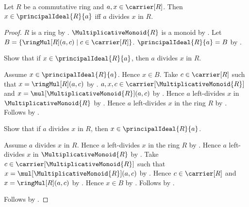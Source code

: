 \begin{theorem}\label{principal_ideal_membership_iff_divisibility}
    Let $R$ be a commutative ring and $a,x\in\carrier[R]$.
    Then $x\in\principalIdeal{R}{a}$ iff $a$ divides $x$ in $R$.
\end{theorem}
\begin{proof}
    $R$ is a ring by .
    $\MultiplicativeMonoid{R}$ is a monoid by
        .
    Let $B=\{\ringMul[R](a,c)\mid c\in\carrier[R]\}$.
    $\principalIdeal{R}{a}=B$ by
        .

    Show that if $x\in\principalIdeal{R}{a}$, then
        $a$ divides $x$ in $R$.
    \begin{subproof}
        Assume $x\in\principalIdeal{R}{a}$.
        Hence $x\in B$.
        Take $c\in\carrier[R]$ such that
            $x=\ringMul[R](a,c)$ by \auto.
        $a,x,c\in\carrier[\MultiplicativeMonoid{R}]$ and
            $x=\mul[\MultiplicativeMonoid{R}](a,c)$ by
            .
        Hence $a$ left-divides $x$ in $\MultiplicativeMonoid{R}$ by
            .
        Hence $a$ left-divides $x$ in the ring $R$ by
            .
        Follows by .
    \end{subproof}

    Show that if $a$ divides $x$ in $R$, then
        $x\in\principalIdeal{R}{a}$.
    \begin{subproof}
        Assume $a$ divides $x$ in $R$.
        Hence $a$ left-divides $x$ in the ring $R$ by
            .
        Hence $a$ left-divides $x$ in $\MultiplicativeMonoid{R}$ by
            .
        Take $c\in\carrier[\MultiplicativeMonoid{R}]$ such that
            $x=\mul[\MultiplicativeMonoid{R}](a,c)$ by
            .
        Hence $c\in\carrier[R]$ and $x=\ringMul[R](a,c)$ by
            .
        Hence $x\in B$ by \auto.
        Follows by \auto.
    \end{subproof}
    Follows by \auto.
\end{proof}

